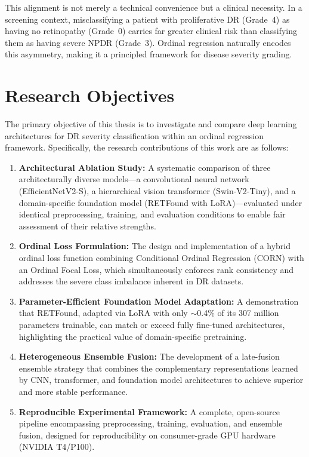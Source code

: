 This alignment is not merely a technical convenience but a clinical necessity. In a screening context, misclassifying a patient with proliferative DR (Grade~4) as having no retinopathy (Grade~0) carries far greater clinical risk than classifying them as having severe NPDR (Grade~3). Ordinal regression naturally encodes this asymmetry, making it a principled framework for disease severity grading.

\section{Research Objectives}
\label{sec:objectives}

The primary objective of this thesis is to investigate and compare deep learning architectures for DR severity classification within an ordinal regression framework. Specifically, the research contributions of this work are as follows:

\begin{enumerate}
    \item \textbf{Architectural Ablation Study:} A systematic comparison of three architecturally diverse models---a convolutional neural network (EfficientNetV2-S), a hierarchical vision transformer (Swin-V2-Tiny), and a domain-specific foundation model (RETFound with LoRA)---evaluated under identical preprocessing, training, and evaluation conditions to enable fair assessment of their relative strengths.
    
    \item \textbf{Ordinal Loss Formulation:} The design and implementation of a hybrid ordinal loss function combining Conditional Ordinal Regression (CORN) with an Ordinal Focal Loss, which simultaneously enforces rank consistency and addresses the severe class imbalance inherent in DR datasets.
    
    \item \textbf{Parameter-Efficient Foundation Model Adaptation:} A demonstration that RETFound, adapted via LoRA with only $\sim$0.4\% of its 307 million parameters trainable, can match or exceed fully fine-tuned architectures, highlighting the practical value of domain-specific pretraining.
    
    \item \textbf{Heterogeneous Ensemble Fusion:} The development of a late-fusion ensemble strategy that combines the complementary representations learned by CNN, transformer, and foundation model architectures to achieve superior and more stable performance.
    
    \item \textbf{Reproducible Experimental Framework:} A complete, open-source pipeline encompassing preprocessing, training, evaluation, and ensemble fusion, designed for reproducibility on consumer-grade GPU hardware (NVIDIA T4/P100).
\end{enumerate}


